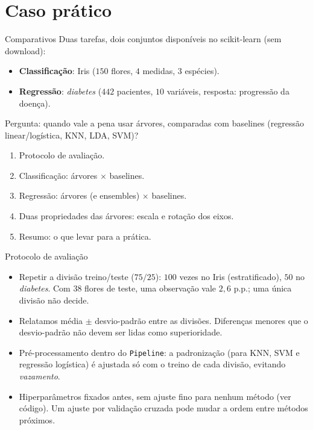 \section{Caso prático}\label{sec:caso}

\begin{frame}{Comparativos}
Duas tarefas, dois conjuntos \alert{disponíveis no scikit-learn} (sem download):
\begin{itemize}
  \item \textbf{Classificação}: Iris ($150$ flores, $4$ medidas, $3$ espécies).
  \item \textbf{Regressão}: \emph{diabetes} ($442$ pacientes, $10$ variáveis, resposta: progressão da doença).
\end{itemize}
Pergunta: \alert{quando vale a pena usar árvores}, comparadas com \alert{baselines} (regressão linear/logística, KNN, LDA, SVM)?
\begin{enumerate}
  \item Protocolo de avaliação.
  \item Classificação: árvores $\times$ baselines.
  \item Regressão: árvores (e ensembles) $\times$ baselines.
  \item Duas propriedades das árvores: \alert{escala} e \alert{rotação} dos eixos.
  \item Resumo: o que levar para a prática.
\end{enumerate}
\end{frame}

\begin{frame}{Protocolo de avaliação}
\begin{itemize}
  \item \alert{Repetir} a divisão treino/teste ($75/25$): $100$ vezes no Iris (estratificado), $50$ no \emph{diabetes}. Com $38$ flores de teste, uma observação vale $2{,}6$ p.p.; uma única divisão não decide.
  \item Relatamos \alert{média $\pm$ desvio-padrão} entre as divisões. Diferenças menores que o desvio-padrão \alert{não} devem ser lidas como superioridade.
  \item Pré-processamento \alert{dentro} do \texttt{Pipeline}: a padronização (para KNN, SVM e regressão logística) é ajustada só com o treino de cada divisão, evitando \emph{vazamento}.
  \item Hiperparâmetros \alert{fixados antes}, sem ajuste fino para nenhum método (ver código). Um ajuste por validação cruzada pode mudar a ordem entre métodos próximos.
\end{itemize}
\end{frame}

